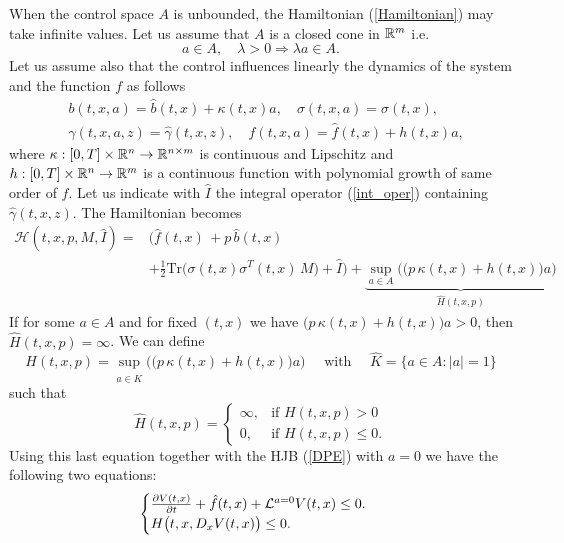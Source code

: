 When the control space $A$ is unbounded, the Hamiltonian (\ref{Hamiltonian}) may take infinite values. Let us assume that $A$ is a closed cone in $\mathbb{R}^m$ i.e. 
\begin{equation}\label{unbounded_set}
 a \in A, \quad \lambda > 0 \Longrightarrow \lambda a \in A.
\end{equation}
Let us assume also that the control influences linearly the dynamics of the system and the function $f$ as follows
\begin{align}\label{linear_control}
 & b(t,x,a) = \hat b(t,x) + \kappa(t,x) a, \quad \sigma(t,x,a) = \hat \sigma(t,x), \\ \nonumber
 & \gamma(t,x,a,z) = \hat \gamma(t,x,z), \quad f(t,x,a) = \hat f(t,x) + h(t,x) a, 
\end{align}
where $\kappa : [0,T] \times \mathbb{R}^n \to \mathbb{R}^{n \times m}$ is continuous and Lipschitz and $h: [0,T] \times \mathbb{R}^n \to \mathbb{R}^{m}$ is a continuous function with polynomial growth of same order
of $f$.
Let us indicate with $\hat I$ the integral operator (\ref{int_oper}) containing $\hat \gamma(t,x,z)$.
The Hamiltonian becomes
\begin{align*}
 \mathcal{H}(t,x,p,M,\hat I) =& \biggl( \hat f(t,x) \, + p \, \hat b(t,x) \\ \nonumber
              &+ \frac{1}{2} \mbox{Tr} \bigl( \sigma(t,x)\sigma^T(t,x) \, M \bigr) +\hat I \biggr) + 
              \underbrace{\sup_{a \in A} \biggl( \bigl( p \, \kappa(t,x) + h(t,x) \bigr) a \biggr) }_{\hat H(t,x,p)} 
\end{align*}
If for some $a\in A$ and for fixed $(t,x)$ we have $\bigl( p \, \kappa(t,x) + h(t,x) \bigr) a>0$, then $\hat H(t,x,p) = \infty$. We can define 
\begin{equation}
 H(t,x,p) = \sup_{a \in \hat K} \biggl( \bigl( p \, \kappa(t,x) + h(t,x) \bigr) a \biggr) \quad \mbox{ with } \quad \hat K = \{ a \in A: |a|=1 \}
\end{equation}
such that
\begin{equation}
\hat H(t,x,p) = \begin{cases} 
 \infty, & \mbox{if } H(t,x,p) >0 \\ 
  0,     & \mbox{if } H(t,x,p) \leq 0 . 
\end{cases} 
\end{equation}
Using this last equation together with the HJB (\ref{DPE}) with $a=0$ we have the following two equations:
\begin{equation}
\begin{cases}
 \frac{\partial V(t,x)}{\partial t} + \hat f(t,x) + \mathcal{L}^{a=0}V(t,x)  \leq 0. \\
 H\bigl(t,x, D_x V(t,x) \bigr) \leq 0.
\end{cases}
\end{equation}
